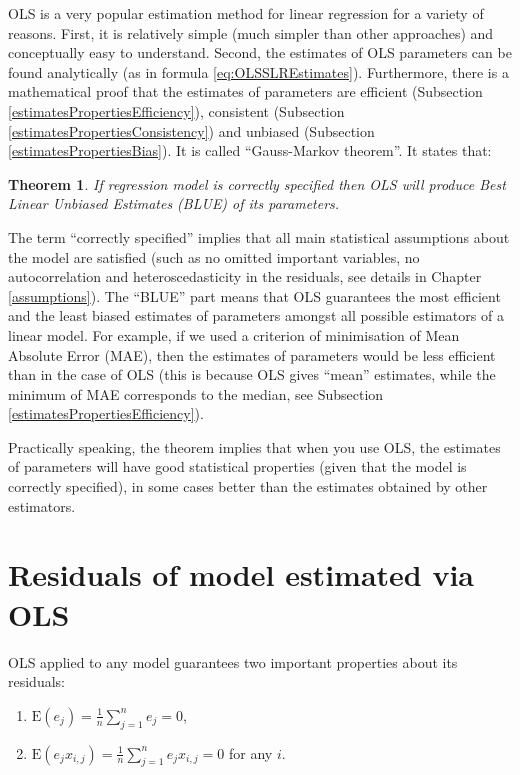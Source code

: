 \documentclass[
]{book}
\providecommand{\tightlist}{%
  \setlength{\itemsep}{0pt}\setlength{\parskip}{0pt}}
\newtheorem{theorem}{Theorem}[chapter]
\theoremstyle{definition}
\theoremstyle{definition}
\theoremstyle{definition}
\theoremstyle{definition}
\theoremstyle{remark}
\begin{document}
OLS is a very popular estimation method for linear regression for a variety of reasons. First, it is relatively simple (much simpler than other approaches) and conceptually easy to understand. Second, the estimates of OLS parameters can be found analytically (as in formula \eqref{eq:OLSSLREstimates}). Furthermore, there is a mathematical proof that the estimates of parameters are efficient (Subsection \ref{estimatesPropertiesEfficiency}), consistent (Subsection \ref{estimatesPropertiesConsistency}) and unbiased (Subsection \ref{estimatesPropertiesBias}). It is called ``Gauss-Markov theorem''. It states that:

\begin{theorem}
If regression model is correctly specified then OLS will produce Best Linear Unbiased Estimates (BLUE) of its parameters.
\end{theorem}

The term ``correctly specified'' implies that all main statistical assumptions about the model are satisfied (such as no omitted important variables, no autocorrelation and heteroscedasticity in the residuals, see details in Chapter \ref{assumptions}). The ``BLUE'' part means that OLS guarantees the most efficient and the least biased estimates of parameters amongst all possible estimators of a linear model. For example, if we used a criterion of minimisation of Mean Absolute Error (MAE), then the estimates of parameters would be less efficient than in the case of OLS (this is because OLS gives ``mean'' estimates, while the minimum of MAE corresponds to the median, see Subsection \ref{estimatesPropertiesEfficiency}).

Practically speaking, the theorem implies that when you use OLS, the estimates of parameters will have good statistical properties (given that the model is correctly specified), in some cases better than the estimates obtained by other estimators.

\hypertarget{OLSResiduals}{%
\section{Residuals of model estimated via OLS}\label{OLSResiduals}}

OLS applied to any model guarantees two important properties about its residuals:

\begin{enumerate}
\def\labelenumi{\arabic{enumi}.}
\tightlist
\item
  \(\mathrm{E}(e_j) = \frac{1}{n} \sum_{j=1}^n e_j = 0\),
\item
  \(\mathrm{E}(e_j x_{i,j}) = \frac{1}{n} \sum_{j=1}^n e_j x_{i,j} = 0\) for any \(i\).
\end{enumerate}
\end{document}
